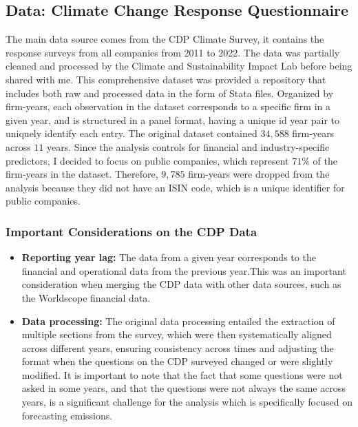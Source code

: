 \subsection{Data: Climate Change Response Questionnaire}
The main data source comes from the CDP Climate Survey, it contains the response surveys from all companies from 2011 to 2022. The data was partially cleaned and processed by the Climate and Sustainability Impact Lab \cite{HarvardD3Lab2024} before being shared with me. This comprehensive dataset was provided a repository that includes both raw and processed data in the form of Stata files. Organized by firm-years, each observation in the dataset corresponds to a specific firm in a given year, and is structured in a panel format, having a unique id year pair to uniquely identify each entry. The original dataset contained $34,588$ firm-years across $11$ years. Since the analysis controls for financial and industry-specific predictors, I decided to focus on public companies, which represent $71\%$ of the firm-years in the dataset. Therefore, $9,785$ firm-years were dropped from the analysis because they did not have an ISIN code, which is a unique identifier for public companies. 

\subsubsection{Important Considerations on the CDP Data}
\begin{itemize}
    \item \textbf{Reporting year lag:} The data from a given year corresponds to the financial and operational data from the previous year.This was an important consideration when merging the CDP data with other data sources, such as the Worldscope financial data.
    \item \textbf{Data processing:} The original data processing entailed the extraction of multiple sections from the survey, which were then systematically aligned across different years, ensuring consistency across times and adjusting the format when the questions on the CDP surveyed changed or were slightly modified. It is important to note that the fact that some questions were not asked in some years, and that the questions were not always the same across years, is a significant challenge for the analysis which is specifically focused on forecasting emissions.

\end{itemize}


